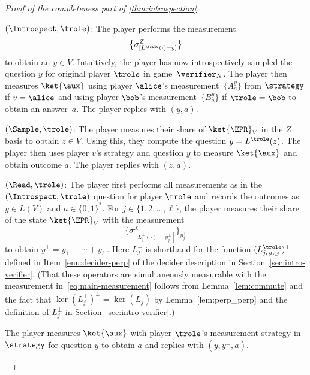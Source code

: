 \begin{proof}[Proof of the completeness part of \cref{thm:introspection}]
  \begin{description}
  \item $(\Introspect, \trole)$: The player performs the measurement
    \begin{equation}
      \label{eq:main-measurement}
      \bigl\{ \sigma^Z_{[L^\trole(\cdot) = y]} \bigr\}
    \end{equation}
    to obtain an $y\in V$.
    Intuitively, the player has now introspectively sampled the question $y$ for
    original player $\trole$ in game~$\verifier_N$.
    The player then measures $\ket{\aux}$ using player $\alice$'s
    measurement~$\{A^y_a\}$ from $\strategy$ if $v = \alice$ and using player
    $\bob$'s measurement~$\{B^y_a\}$ if $\trole = \bob$ to obtain an answer~$a$.
    The player replies with $(y,a)$.
  \item $(\Sample, \trole)$: The player measures their share of $\ket{\EPR}_V$
    in the $Z$ basis to obtain $z \in V$.
    Using this, they compute the question $y = L^\trole(z)$.
    The player then uses player $v$'s strategy and question $y$ to measure
    $\ket{\aux}$ and obtain outcome $a$.
    The player replies with $(z, a)$.
  \item $(\Read, \trole)$: The player first performs all measurements as in the
    $(\Introspect, \trole)$ question for player $\trole$ and records the
    outcomes as $y\in L(V)$ and $a\in\{0,1\}^*$.
    For $j\in \{1, 2, \ldots, \ell\}$, the player measures their share of the state
    $\ket{\EPR}_V$ with the measurement
\begin{equation}
      \label{eq:perp-measurement}
      \big\{\sigma^X_{[L_j^\perp (\cdot) = y_j^\perp]} \big\}_{y_j^\perp}
    \end{equation}
    to obtain $y^\perp = y_1^\perp + \cdots + y_\ell^\perp$.
    Here $L_j^\perp$ is shorthand for the function $(L^{\trole}_{j,\,
      y_{<j}})^\perp$ defined in Item~\ref{enu:decider-perp} of the decider
    description in Section~\ref{sec:intro-verifier}.
    (That these operators are simultaneously measurable with the measurement
    in~\eqref{eq:main-measurement} follows from Lemma~\ref{lem:commute} and the
    fact that $\ker(L^\perp_{j})^\perp = \ker(L_{j})$ by
    Lemma~\ref{lem:perp_perp} and the definition of $L^\perp_{j}$ in
    Section~\ref{sec:intro-verifier}.)
    
    The player measures $\ket{\aux}$ with player $\trole$'s measurement strategy
    in $\strategy$ for question $y$ to obtain $a$ and replies with
    $(y,y^\perp,a)$.


\end{description}
\end{proof}
